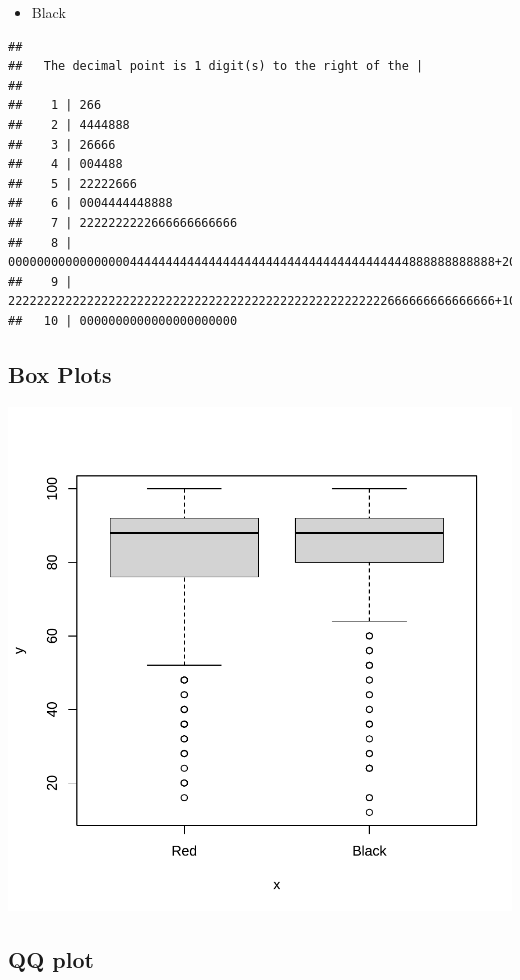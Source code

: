 \documentclass[
]{book}
\providecommand{\tightlist}{%
  \setlength{\itemsep}{0pt}\setlength{\parskip}{0pt}}
\begin{document}
\begin{itemize}
\tightlist
\item
  Black
\end{itemize}

\begin{verbatim}
## 
##   The decimal point is 1 digit(s) to the right of the |
## 
##    1 | 266
##    2 | 4444888
##    3 | 26666
##    4 | 004488
##    5 | 22222666
##    6 | 0004444448888
##    7 | 2222222222666666666666
##    8 | 00000000000000000444444444444444444444444444444444444444888888888888+20
##    9 | 22222222222222222222222222222222222222222222222222222666666666666666+10
##   10 | 0000000000000000000000
\end{verbatim}

\subsection{Box Plots}\label{box-plots}

\includegraphics{Quiz_report_2025_files/figure-latex/boxplots-1.pdf}

\subsection{QQ plot}\label{qq-plot}
\end{document}
